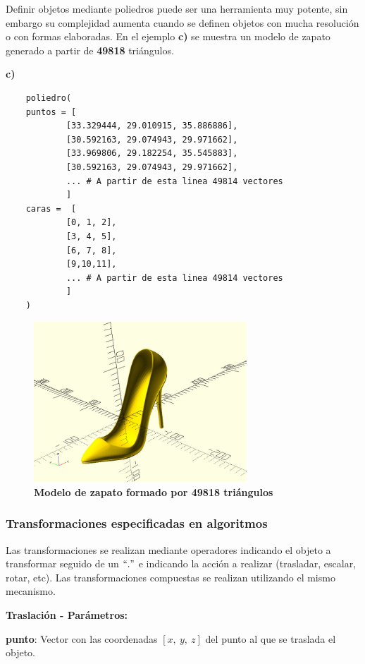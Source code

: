 \clearpage
Definir objetos mediante poliedros puede ser una herramienta muy potente, sin embargo su complejidad aumenta cuando se definen objetos con mucha resolución o con formas elaboradas. En el ejemplo \textbf{c)} se muestra un modelo de zapato generado a partir de \textbf{49818} triángulos. 

\textbf{c)} 

\begin{verbatim}
    poliedro(
    puntos = [
        	[33.329444, 29.010915, 35.886886],
        	[30.592163, 29.074943, 29.971662],
        	[33.969806, 29.182254, 35.545883],
        	[30.592163, 29.074943, 29.971662],
        	... # A partir de esta linea 49814 vectores
        	]
    caras =  [
        	[0, 1, 2],
        	[3, 4, 5],
        	[6, 7, 8],
        	[9,10,11],
        	... # A partir de esta linea 49814 vectores
        	]
    )

\end{verbatim}

\begin{figure}[h]
\includegraphics[width=8cm]{Img/Modelos/modelado14.jpg}
\centering
\caption{\textbf{ \footnotesize{Modelo de zapato formado por 49818 triángulos }}}
\end{figure}

\clearpage
\subsubsection{Transformaciones especificadas en algoritmos}

Las transformaciones se realizan mediante operadores indicando el objeto a transformar seguido de un $``."$ e indicando la acción a realizar (trasladar, escalar, rotar, etc). Las transformaciones compuestas se realizan utilizando el mismo mecanismo.

\begin{description}
\item  \textbf{Traslación - Parámetros:}
\item  \textbf{punto}: Vector con las coordenadas $[x,\ y, \ z]$ del punto al que se traslada el objeto.
\end{description}

